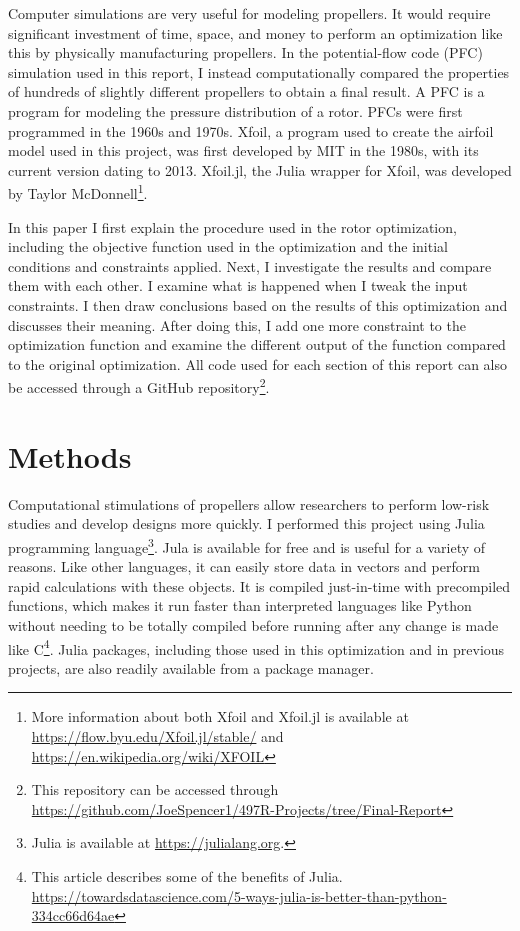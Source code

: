 \documentclass[journal ]{new-aiaa}
\begin{document}
Computer simulations are very useful for modeling propellers. It would require significant investment of time, space, and money to perform an optimization like this by physically manufacturing propellers. In the potential-flow code (PFC) simulation used in this report, I instead computationally compared the properties of hundreds of slightly different propellers to obtain a final result. A PFC is a program for modeling the pressure distribution of a rotor. PFCs were first programmed in the 1960s and 1970s. Xfoil, a program used to create the airfoil model used in this project, was first developed by MIT in the 1980s, with its current version dating to 2013. Xfoil.jl, the Julia wrapper for Xfoil, was developed by Taylor McDonnell\footnote{More information about both Xfoil and Xfoil.jl is available at \url{https://flow.byu.edu/Xfoil.jl/stable/} and \url{https://en.wikipedia.org/wiki/XFOIL}}.

In this paper I first explain the procedure used in the rotor optimization, including the objective function used in the optimization and the initial conditions and constraints applied. Next, I investigate the results and compare them with each other. I examine what is happened when I tweak the input constraints. I then draw conclusions based on the results of this optimization and discusses their meaning. After doing this, I add one more constraint to the optimization function and examine the different output of the function compared to the original optimization. All code used for each section of this report can also be accessed through a GitHub repository\footnote{This repository can be accessed through \url{https://github.com/JoeSpencer1/497R-Projects/tree/Final-Report}}.


\section{Methods}

Computational stimulations of propellers allow researchers to perform low-risk studies and develop designs more quickly. I performed this project using Julia programming language\footnote{Julia is available at \url{https://julialang.org}.}. Jula is available for free and is useful for a variety of reasons. Like other languages, it can easily store data in vectors and perform rapid calculations with these objects. It is compiled just-in-time with precompiled functions, which makes it run faster than interpreted languages like Python without needing to be totally compiled before running after any change is made like C\footnote{This article describes some of the benefits of Julia. \url{https://towardsdatascience.com/5-ways-julia-is-better-than-python-334cc66d64ae}}. Julia  packages, including those used in this optimization and in previous projects, are also readily available from a package manager.
\end{document}
